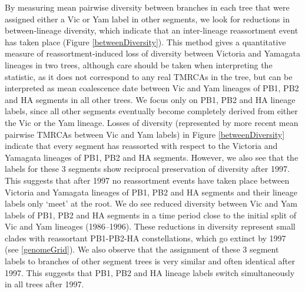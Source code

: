 \documentclass[11pt,oneside,letterpaper]{article}
\begin{document}
By measuring mean pairwise diversity between branches in each tree that were assigned either a Vic or Yam label in other segments, we look for reductions in between-lineage diversity, which indicate that an inter-lineage reassortment event has taken place (Figure \ref{betweenDiversity}).
This method gives a quantitative measure of reassortment-induced loss of diversity between Victoria and Yamagata lineages in two trees, although care should be taken when interpreting the statistic, as it does not correspond to any real TMRCAs in the tree, but can be interpreted as mean coalescence date between Vic and Yam lineages of PB1, PB2 and HA segments in all other trees.
We focus only on PB1, PB2 and HA lineage labels, since all other segments eventually become completely derived from either the Vic or the Yam lineage.
Losses of diversity (represented by more recent mean pairwise TMRCAs between Vic and Yam labels) in Figure \ref{betweenDiversity} indicate that every segment has reassorted with respect to the Victoria and Yamagata lineages of PB1, PB2 and HA segments.
However, we also see that the labels for these 3 segments show reciprocal preservation of diversity after 1997.
This suggests that after 1997 no reassortment events have taken place between Victoria and Yamagata lineages of PB1, PB2 and HA segments and their lineage labels only `meet' at the root.
We do see reduced diversity between Vic and Yam labels of PB1, PB2 and HA segments in a time period close to the initial split of Vic and Yam lineages (1986--1996).
These reductions in diversity represent small clades with reassortant PB1-PB2-HA constellations, which go extinct by 1997 (see \ref{genomeGrid}).
We also observe that the assignment of these 3 segment labels to branches of other segment trees is very similar and often identical after 1997.
This suggests that PB1, PB2 and HA lineage labels switch simultaneously in all trees after 1997.
\end{document}
